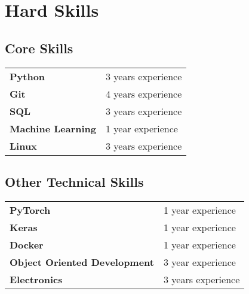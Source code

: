 \documentclass[9pt]{article}
\begin{document}
    \section*{Hard Skills}
    \begin{minipage}[ht]{0.48\textwidth}
        \subsection*{Core Skills}
        \begin{tabular}{ll}
            \bf Python&3 years experience\\
            \bf Git&4 years experience\\
            \bf SQL&3 years experience\\
            \bf Machine Learning&1 year experience\\
            \bf Linux&3 years experience\\
        \end{tabular}
    \end{minipage}
    \begin{minipage}[ht]{0.48\textwidth}
        \subsection*{Other Technical Skills}
        \begin{tabular}{ll}
            \bf PyTorch&1 year experience\\
            \bf Keras&1 year experience\\
            \bf Docker&1 year experience\\
            \bf Object Oriented Development&3 year experience\\
            \bf Electronics &3 years experience\\
        \end{tabular}
    \end{minipage}
\end{document}
